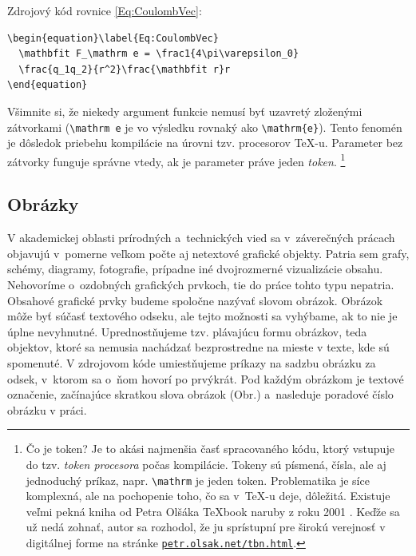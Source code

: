 Zdrojový kód rovnice \eqref{Eq:CoulombVec}:
\begin{verbatim}
\begin{equation}\label{Eq:CoulombVec}
  \mathbfit F_\mathrm e = \frac1{4\pi\varepsilon_0}
  \frac{q_1q_2}{r^2}\frac{\mathbfit r}r
\end{equation}
\end{verbatim}
Všimnite si, že niekedy argument funkcie nemusí byť
uzavretý zloženými zátvorkami (\verb|\mathrm e| je vo výsledku rovnaký ako \verb|\mathrm{e}|).
Tento fenomén je dôsledok priebehu kompilácie na úrovni tzv. procesorov \TeX-u.
Parameter bez zátvorky funguje správne vtedy,
ak je parameter práve jeden \emph{token}.%
\footnote{Čo je token? Je to akási najmenšia časť spracovaného
kódu, ktorý vstupuje do tzv. \emph{token procesora}
počas kompilácie.
Tokeny sú písmená, čísla, ale aj jednoduchý príkaz,
napr. \texttt{\textbackslash mathrm} je jeden token.
Problematika je síce komplexná, ale na pochopenie
toho, čo sa v~\TeX-u deje, dôležitá.
Existuje veľmi pekná kniha od Petra Olšáka \TeX book naruby z roku 2001 \cite{Olsak2001Texbook}.
Keďže sa už nedá zohnať, autor sa rozhodol, že ju sprístupní pre širokú verejnosť v digitálnej forme na stránke
\href{https://petr.olsak.net/tbn.html}{\texttt{petr.olsak.net/tbn.html}}.
}

\subsection{Obrázky}
V akademickej oblasti prírodných a~technických vied sa v~záverečných prácach
objavujú v~pomerne veľkom počte aj netextové grafické objekty. Patria sem grafy, schémy, diagramy, fotografie,
prípadne iné dvojrozmerné vizualizácie obsahu.
Nehovoríme o~ozdobných grafických prvkoch,
tie do práce tohto typu nepatria.
Obsahové grafické prvky budeme spoločne nazývať slovom obrázok.
Obrázok môže byť súčasť textového odseku,
ale tejto možnosti sa vyhýbame,
ak to nie je úplne nevyhnutné.
Uprednostňujeme tzv. plávajúcu formu obrázkov,
teda objektov, ktoré sa nemusia nachádzať bezprostredne
na mieste v texte, kde sú spomenuté.
V zdrojovom kóde umiestňujeme príkazy na sadzbu obrázku za odsek,
v~ktorom sa o~ňom hovorí po prvýkrát.
Pod každým obrázkom je textové označenie,
začínajúce skratkou slova obrázok (Obr.) a~nasleduje
poradové číslo obrázku v práci.

